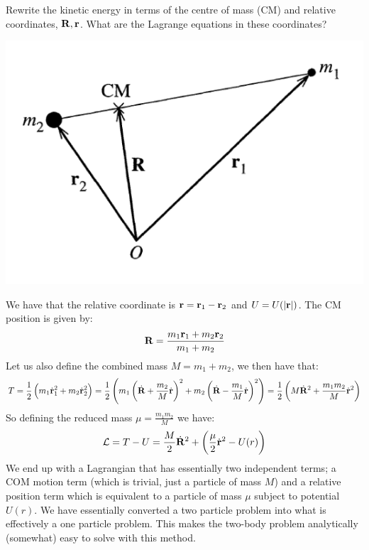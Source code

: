 \begin{p}
Rewrite the kinetic energy in terms of the centre of mass (CM) and relative coordinates, $\mathbf{R}, \mathbf{r}$. What are the Lagrange equations in these coordinates?
\begin{center}
    \includegraphics[scale=0.6]{Lecture-3/W3-img1.png}
\end{center}
\end{p}
\begin{s}
We have that the relative coordinate is $\mathbf{r} = \mathbf{r}_1 - \mathbf{r}_2$ and $U = U(\abs{\mathbf{r}})$. The CM position is given by:
\[\mathbf{R} = \frac{m_1\mathbf{r}_1 + m_2\mathbf{r}_2}{m_1 + m_2}\]
Let us also define the combined mass $M = m_1 + m_2$, we then have that:
\[T = \frac{1}{2}\left(m_1\dot{\mathbf{r}}_1^2 + m_2\dot{\mathbf{r}}_2^2\right) = \frac{1}{2}\left(m_1\left(\dot{\mathbf{R}} + \frac{m_2}{M}\dot{\mathbf{r}}\right)^2 + m_2\left(\dot{\mathbf{R}} - \frac{m_1}{M}\dot{\mathbf{r}}\right)^2\right) = \frac{1}{2}\left(M\dot{\mathbf{R}}^2 + \frac{m_1m_2}{M}\dot{\mathbf{r}}^2\right)\]
So defining the reduced mass $\mu = \frac{m_1m_2}{M}$ we have:
\[\mathcal{L} = T - U = \frac{M}{2}\dot{\mathbf{R}}^2 + \left(\frac{\mu}{2}\dot{\mathbf{r}}^2 - U(r)\right)\]
We end up with a Lagrangian that has essentially two independent terms; a COM motion term (which is trivial, just a particle of mass $M$) and a relative position term which is equivalent to a particle of mass $\mu$ subject to potential $U(r)$. We have essentially converted a two particle problem into what is effectively a one particle problem. This makes the two-body problem analytically (somewhat) easy to solve with this method.
\end{s}

